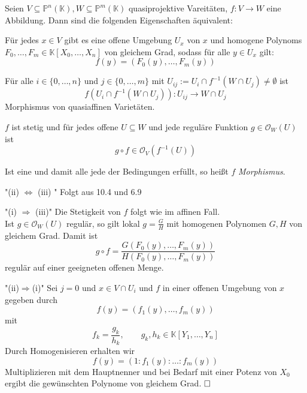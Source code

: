 \documentclass[11pt]{book}
\theoremstyle{nonumberbreak}
\newenvironment{pr}[1][]{\ifthenelse{\equal{#1}{}}{\proof}{\proof[#1]}\rm}{\endproof}
\newenvironment{ex}[1][]{\ifthenelse{\equal{#1}{}}{\example}{\example[#1]}\rm}{\endexample}
\newenvironment{propdefin}[1][]{\ifthenelse{\equal{#1}{}}{\propdefini}{\propdefini[#1]}\rm}{\endpropdefini}
\begin{document}
\begin{spacing}{1.3}
\begin{propdefin} %
Seien $V \subseteq \mathbb{P}^n(\mathbb{K}), W \subseteq \mathbb{P}^m(\mathbb{K})$ quasiprojektive Vareitäten, $f: V \longrightarrow W$ eine Abbildung. Dann sind die folgenden Eigenschaften äquivalent:
\begin{compactenum}
\item Für jedes $x \in V$ gibt es eine offene Umgebung $U_x$ von $x$ und homogene Polynoms $F_0, \ldots, F_m \in \mathbb{K}[X_0, \ldots, X_n]$ von gleichem Grad, sodass für alle $y \in U_x$ gilt:
$$f(y)= \left(F_0(y), \ldots, F_m(y) \right)$$
\item Für alle $i \in \{0, \ldots, n \}$ und $j \in \{0, \ldots, m \}$ mit $U_{ij}:= U_i \cap f^{-1}(W \cap U_j) \neq \emptyset$ ist
$$f\left(U_i \cap f^{-1}(W \cap U_j)\right): U_{ij} \longrightarrow W \cap U_j$$
Morphismus von quasiaffinen Varietäten.
\item $f$ ist stetig und für jedes offene $U \subseteq W$ und jede reguläre Funktion $g \in \mathcal{O}_W(U)$ ist
$$ g \circ f \in \mathcal{O}_V(f^{-1}(U))$$
\end{compactenum}
Ist eine und damit alle jede der Bedingungen erfüllt, so heißt $f$ \textit{Morphismus}.
\begin{pr}
\begin{compactenum}
\item["(ii) $\Leftrightarrow$ (iii) "] Folgt aus 10.4 und 6.9
\item["(i) $\Rightarrow$ (iii)"] Die Stetigkeit von $f$ folgt wie im affinen Fall.\\
Ist $g \in \mathcal{O}_W(U)$ regulär, so gilt lokal $g= \frac{G}{H}$ mit homogenen Polynomen $G,H$ von gleichem Grad. Damit ist
$$g \circ f = \frac{G(F_0(y), \ldots, F_m(y))}{H(F_0(y), \ldots, F_m(y))}$$
regulär auf einer geeigneten offenen Menge.
\item["(ii)$\Rightarrow$(i)"] Sei $j=0$ und $x \in V \cap U_i$ und $f$ in einer offenen Umgebung von $x$ gegeben durch 
$$f(y)=(f_1(y), \ldots, f_m(y))$$
mit 
$$f_k= \frac{g_k}{h_k}, \qquad g_k, h_k \in \mathbb{K}[Y_1, \ldots, Y_n]$$
Durch Homogenisieren erhalten wir
$$f(y)=(1:f_1(y): \ldots: f_m(y))$$
Multiplizieren mit dem Hauptnenner und bei Bedarf mit einer Potenz von $X_0$ ergibt die gewünschten Polynome von gleichem Grad. $\hfill \Box$
\end{compactenum}
\end{pr}
\end{propdefin}

\begin{ex} %


\end{ex}
\end{spacing}
\end{document}
